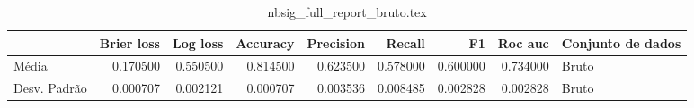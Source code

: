 \begin{table}
\centering
\caption{nbsig_full_report_bruto.tex}
\label{nbsig_full_report_bruto.tex}
\begin{tabular}{lrrrrrrrl}
\toprule
{} &  Brier  loss &  Log loss &  Accuracy  &  Precision  &   Recall  &       F1  &  Roc auc  & Conjunto de dados \\
\midrule
Média        &     0.170500 &  0.550500 &   0.814500 &    0.623500 &  0.578000 &  0.600000 &  0.734000 &             Bruto \\
Desv. Padrão &     0.000707 &  0.002121 &   0.000707 &    0.003536 &  0.008485 &  0.002828 &  0.002828 &             Bruto \\
\bottomrule
\end{tabular}
\end{table}
